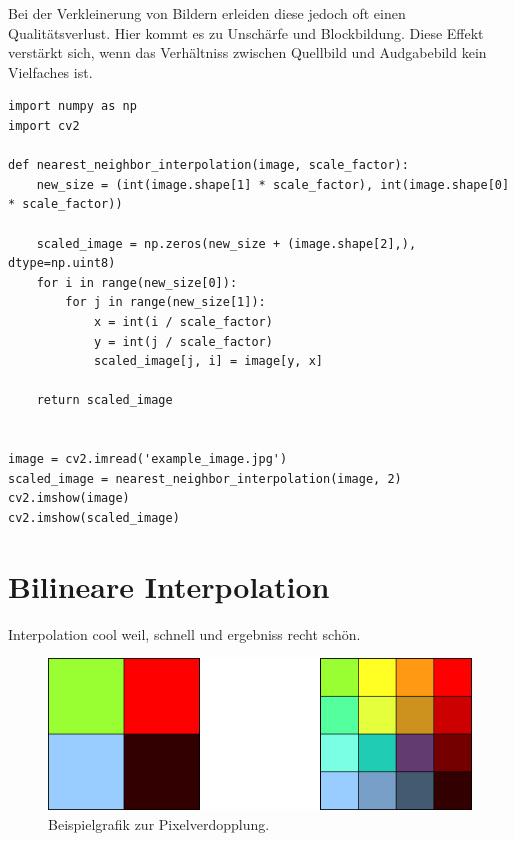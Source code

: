 Bei der Verkleinerung von Bildern erleiden diese jedoch oft einen Qualitätsverlust.
Hier kommt es zu Unschärfe und Blockbildung. 
Diese Effekt verstärkt sich, wenn das Verhältniss zwischen Quellbild und Audgabebild kein Vielfaches ist. 
\begin{acronym}
\end{acronym}
\begin{lstlisting}
import numpy as np
import cv2

def nearest_neighbor_interpolation(image, scale_factor):
    new_size = (int(image.shape[1] * scale_factor), int(image.shape[0] * scale_factor))
    
    scaled_image = np.zeros(new_size + (image.shape[2],), dtype=np.uint8)
    for i in range(new_size[0]):
        for j in range(new_size[1]):
            x = int(i / scale_factor)
            y = int(j / scale_factor)
            scaled_image[j, i] = image[y, x]
    
    return scaled_image


image = cv2.imread('example_image.jpg')
scaled_image = nearest_neighbor_interpolation(image, 2)
cv2.imshow(image)
cv2.imshow(scaled_image)
\end{lstlisting}
\section{Bilineare Interpolation}

Interpolation cool weil, schnell und ergebniss recht schön.


\begin{figure}
    \centering
    \includegraphics[width=\textwidth]{img/pixel_verdopplung.png}
    \caption{Beispielgrafik zur Pixelverdopplung.}
    \label{fig:my_label}
\end{figure}

